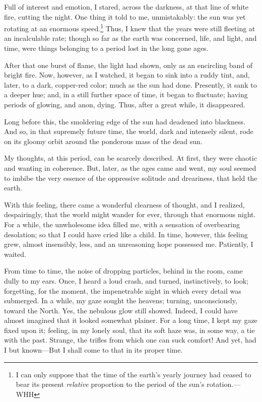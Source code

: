 Full of interest and emotion, I stared, across the darkness, at that line of white fire, cutting the night. One thing it told to me, unmistakably: the sun was yet rotating at an enormous speed.\footnote{I can only suppose that the time of the earth’s yearly journey had ceased to bear its present \textit{relative} proportion to the period of the sun’s rotation.---WHH} Thus, I knew that the years were still fleeting at an incalculable rate; though so far as the earth was concerned, life, and light, and time, were things belonging to a period lost in the long gone ages.

After that one burst of flame, the light had shown, only as an encircling band of bright fire. Now, however, as I watched, it began to sink into a ruddy tint, and, later, to a dark, copper-red color; much as the sun had done. Presently, it sank to a deeper hue; and, in a still further space of time, it began to fluctuate; having periods of glowing, and anon, dying. Thus, after a great while, it disappeared.

Long before this, the smoldering edge of the sun had deadened into blackness. And so, in that supremely future time, the world, dark and intensely silent, rode on its gloomy orbit around the ponderous mass of the dead sun.

My thoughts, at this period, can be scarcely described. At first, they were chaotic and wanting in coherence. But, later, as the ages came and went, my soul seemed to imbibe the very essence of the oppressive solitude and dreariness, that held the earth.

With this feeling, there came a wonderful clearness of thought, and I realized, despairingly, that the world might wander for ever, through that enormous night. For a while, the unwholesome idea filled me, with a sensation of overbearing desolation; so that I could have cried like a child. In time, however, this feeling grew, almost insensibly, less, and an unreasoning hope possessed me. Patiently, I waited.

From time to time, the noise of dropping particles, behind in the room, came dully to my ears. Once, I heard a loud crash, and turned, instinctively, to look; forgetting, for the moment, the impenetrable night in which every detail was submerged. In a while, my gaze sought the heavens; turning, unconsciously, toward the North. Yes, the nebulous glow still showed. Indeed, I could have almost imagined that it looked somewhat plainer. For a long time, I kept my gaze fixed upon it; feeling, in my lonely soul, that its soft haze was, in some way, a tie with the past. Strange, the trifles from which one can suck comfort! And yet, had I but known---But I shall come to that in its proper time.

